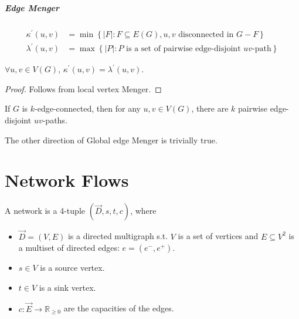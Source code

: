 \paragraph{Edge Menger}
\begin{definition}
    \begin{align*}
        \kappa ^{\prime} (u, v) &= \min \left\{ \vert F \vert: F \subseteq E(G), u, v \text{ disconnected in } G - F   \right\} \\
        \lambda ^{\prime} (u, v) &= \max \left\{ \vert P \vert: P \text{ is a set of pairwise edge-disjoint } uv\text{-path}    \right\} 
    \end{align*}
\end{definition}

\begin{theorem}
    \(\forall u, v \in V(G)\), \(\kappa ^{\prime} (u, v) = \lambda ^{\prime} (u, v)\). 
\end{theorem}
\begin{proof}
    Follows from local vertex Menger. 
\end{proof}

\begin{theorem}
    If \(G\) is \(k\)-edge-connected, then for any \(u, v \in V(G)\), there are \(k\) pairwise edge-disjoint \(uv\)-paths.     
\end{theorem}

\begin{remark}
    The other direction of Global edge Menger is trivially true.
\end{remark}

\chapter{Network Flows}
\begin{definition}
    A network is a 4-tuple \((\vec{D}, s, t, c)\), where 
    \begin{itemize}
        \item \(\vec{D} = (V, E)\) is a directed multigraph s.t. \(V\) is a set of vertices and \(E \subseteq V^2\) is a multiset of directed edges: \(e = (e^-, e^+)\).
        \item \(s \in V\) is a source vertex. 
        \item \(t \in V\) is a sink vertex. 
        \item \(c: \vec{E} \to \mathbb{R} _{\ge 0}\) are the capacities of the edges.   
    \end{itemize}     
\end{definition}

